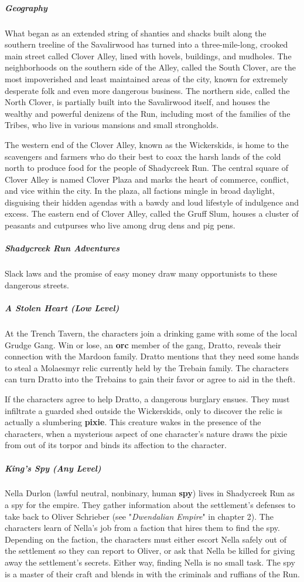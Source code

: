 \documentclass[10pt,a4paper,twoside,bg=print,twocolumn,openany,nodeprecatedcode]{dndbook}
\begin{document}
\subparagraph{Geography}
What began as an extended string of shanties and shacks built along the southern treeline of the Savalirwood has turned into a three-mile-long, crooked main street called Clover Alley, lined with hovels, buildings, and mudholes. The neighborhoods on the southern side of the Alley, called the South Clover, are the most impoverished and least maintained areas of the city, known for extremely desperate folk and even more dangerous business. The northern side, called the North Clover, is partially built into the Savalirwood itself, and houses the wealthy and powerful denizens of the Run, including most of the families of the Tribes, who live in various mansions and small strongholds.

The western end of the Clover Alley, known as the Wickerskids, is home to the scavengers and farmers who do their best to coax the harsh lands of the cold north to produce food for the people of Shadycreek Run. The central square of Clover Alley is named Clover Plaza and marks the heart of commerce, conflict, and vice within the city. In the plaza, all factions mingle in broad daylight, disguising their hidden agendas with a bawdy and loud lifestyle of indulgence and excess. The eastern end of Clover Alley, called the Gruff Slum, houses a cluster of peasants and cutpurses who live among drug dens and pig pens.

\subparagraph{Shadycreek Run Adventures}
Slack laws and the promise of easy money draw many opportunists to these dangerous streets.

\subparagraph{A Stolen Heart (Low Level)}
At the Trench Tavern, the characters join a drinking game with some of the local Grudge Gang. Win or lose, an \textbf{orc} member of the gang, Dratto, reveals their connection with the Mardoon family. Dratto mentions that they need some hands to steal a Molaesmyr relic currently held by the Trebain family. The characters can turn Dratto into the Trebains to gain their favor or agree to aid in the theft.

If the characters agree to help Dratto, a dangerous burglary ensues. They must infiltrate a guarded shed outside the Wickerskids, only to discover the relic is actually a slumbering \textbf{pixie}. This creature wakes in the presence of the characters, when a mysterious aspect of one character's nature draws the pixie from out of its torpor and binds its affection to the character.

\subparagraph{King's Spy (Any Level)}
Nella Durlon (lawful neutral, nonbinary, human \textbf{spy}) lives in Shadycreek Run as a spy for the empire. They gather information about the settlement's defenses to take back to Oliver Schrieber (see "\textit{Dwendalian Empire}" in chapter 2). The characters learn of Nella's job from a faction that hires them to find the spy. Depending on the faction, the characters must either escort Nella safely out of the settlement so they can report to Oliver, or ask that Nella be killed for giving away the settlement's secrets. Either way, finding Nella is no small task. The spy is a master of their craft and blends in with the criminals and ruffians of the Run.
\end{document}
